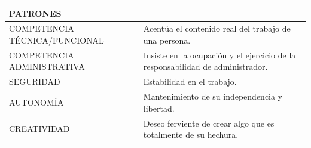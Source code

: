 \documentclass[
]{krantz}
\begin{document}
\begin{longtable}[]{@{}ll@{}}
\toprule
\begin{minipage}[b]{0.47\columnwidth}\raggedright
PATRONES\strut
\end{minipage} & \begin{minipage}[b]{0.47\columnwidth}\raggedright
\strut
\end{minipage}\tabularnewline
\midrule
\endhead
\begin{minipage}[t]{0.47\columnwidth}\raggedright
COMPETENCIA TÉCNICA/FUNCIONAL\strut
\end{minipage} & \begin{minipage}[t]{0.47\columnwidth}\raggedright
Acentúa el contenido real del trabajo de una persona.\strut
\end{minipage}\tabularnewline
\begin{minipage}[t]{0.47\columnwidth}\raggedright
COMPETENCIA ADMINISTRATIVA\strut
\end{minipage} & \begin{minipage}[t]{0.47\columnwidth}\raggedright
Insiste en la ocupación y el ejercicio de la responsabilidad de administrador.\strut
\end{minipage}\tabularnewline
\begin{minipage}[t]{0.47\columnwidth}\raggedright
SEGURIDAD\strut
\end{minipage} & \begin{minipage}[t]{0.47\columnwidth}\raggedright
Estabilidad en el trabajo.\strut
\end{minipage}\tabularnewline
\begin{minipage}[t]{0.47\columnwidth}\raggedright
AUTONOMÍA\strut
\end{minipage} & \begin{minipage}[t]{0.47\columnwidth}\raggedright
Mantenimiento de su independencia y libertad.\strut
\end{minipage}\tabularnewline
\begin{minipage}[t]{0.47\columnwidth}\raggedright
CREATIVIDAD\strut
\end{minipage} & \begin{minipage}[t]{0.47\columnwidth}\raggedright
Deseo ferviente de crear algo que es totalmente de su hechura.\strut
\end{minipage}\tabularnewline
\bottomrule
\end{longtable}
\end{document}
